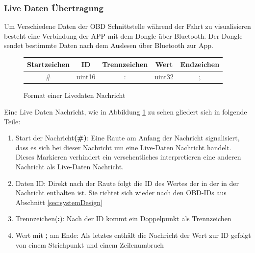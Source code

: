 \subsubsection{Live Daten Übertragung}
Um Verschiedene Daten der OBD Schnittstelle während der Fahrt zu visualisieren besteht eine Verbindung der APP mit dem Dongle über Bluetooth. Der Dongle sendet bestimmte Daten nach dem Auslesen über Bluetooth zur App.
\begin{figure}[H]
\begin{center}
  \begin{tabular}{ | c | c | c | c | c |}
    \hline
    Startzeichen & ID & Trennzeichen & Wert & Endzeichen \\ \hline
    \# & uint16 & : & uint32 & ; \\
    \hline
  \end{tabular}
  \caption{Format einer Livedaten Nachricht}
  \label{fig:LiveDataMessage}
\end{center}
\end{figure}
Eine Live Daten Nachricht, wie in Abbildung \ref{fig:LiveDataMessage} zu sehen gliedert sich in folgende Teile:
\begin{enumerate}
  \item Start der Nachricht\textbf{(\#)}: Eine Raute am Anfang der Nachricht signalisiert, dass es sich bei dieser Nachricht um eine Live-Daten Nachricht handelt. Dieses Markieren verhindert ein versehentliches interpretieren eine anderen Nachricht als Live-Daten Nachricht.
  \item Daten ID: Direkt nach der Raute folgt die ID des Wertes der in der in der Nachricht enthalten ist. Sie richtet sich wieder nach den OBD-IDs aus Abschnitt \ref{sec:systemDesign}
  \item Trennzeichen(\textbf{:}): Nach der ID kommt ein Doppelpunkt als Trennzeichen
  \item Wert mit \textbf{;} am Ende: Als letztes enthält die Nachricht der Wert zur ID gefolgt von einem Strichpunkt und einem Zeilenumbruch 
\end{enumerate}
\pagebreak
